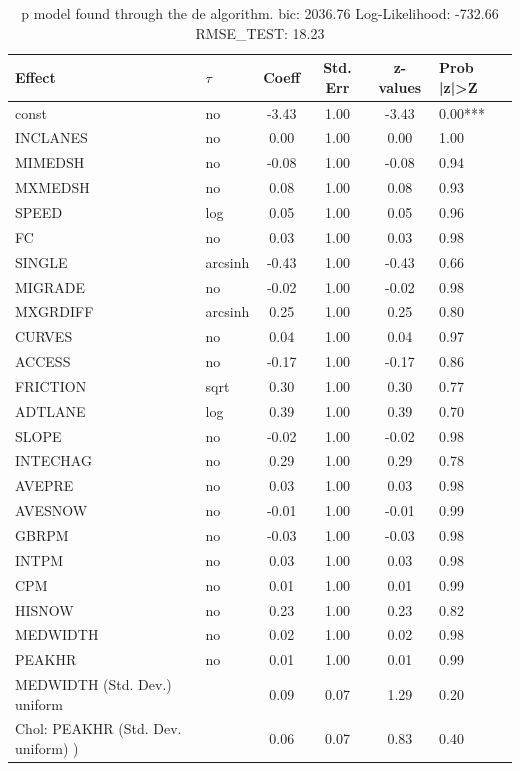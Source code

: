 \begin{table}
	\caption{p model found through the de algorithm. bic: 2036.76 Log-Likelihood: -732.66 RMSE_TEST: 18.23}
	\begin{center}
		\begin{tabular}{|l|l|c|c|c|l|}
			\hline
			Effect & $\tau$ & Coeff & Std. Err & z-values & Prob |z|>Z \\
			\hline
			const & no & -3.43 & 1.00 & -3.43 & 0.00*** \\
			\hline
			INCLANES & no & 0.00 & 1.00 & 0.00 & 1.00 \\
			\hline
			MIMEDSH & no & -0.08 & 1.00 & -0.08 & 0.94 \\
			\hline
			MXMEDSH & no & 0.08 & 1.00 & 0.08 & 0.93 \\
			\hline
			SPEED & log & 0.05 & 1.00 & 0.05 & 0.96 \\
			\hline
			FC & no & 0.03 & 1.00 & 0.03 & 0.98 \\
			\hline
			SINGLE & arcsinh & -0.43 & 1.00 & -0.43 & 0.66 \\
			\hline
			MIGRADE & no & -0.02 & 1.00 & -0.02 & 0.98 \\
			\hline
			MXGRDIFF & arcsinh & 0.25 & 1.00 & 0.25 & 0.80 \\
			\hline
			CURVES & no & 0.04 & 1.00 & 0.04 & 0.97 \\
			\hline
			ACCESS & no & -0.17 & 1.00 & -0.17 & 0.86 \\
			\hline
			FRICTION & sqrt & 0.30 & 1.00 & 0.30 & 0.77 \\
			\hline
			ADTLANE & log & 0.39 & 1.00 & 0.39 & 0.70 \\
			\hline
			SLOPE & no & -0.02 & 1.00 & -0.02 & 0.98 \\
			\hline
			INTECHAG & no & 0.29 & 1.00 & 0.29 & 0.78 \\
			\hline
			AVEPRE & no & 0.03 & 1.00 & 0.03 & 0.98 \\
			\hline
			AVESNOW & no & -0.01 & 1.00 & -0.01 & 0.99 \\
			\hline
			GBRPM & no & -0.03 & 1.00 & -0.03 & 0.98 \\
			\hline
			INTPM & no & 0.03 & 1.00 & 0.03 & 0.98 \\
			\hline
			CPM & no & 0.01 & 1.00 & 0.01 & 0.99 \\
			\hline
			HISNOW & no & 0.23 & 1.00 & 0.23 & 0.82 \\
			\hline
			MEDWIDTH & no & 0.02 & 1.00 & 0.02 & 0.98 \\
			\hline
			PEAKHR & no & 0.01 & 1.00 & 0.01 & 0.99 \\
			\hline
			MEDWIDTH (Std. Dev.) uniform &  & 0.09 & 0.07 & 1.29 & 0.20 \\
			\hline
			 Chol: PEAKHR (Std. Dev. uniform) ) &  & 0.06 & 0.07 & 0.83 & 0.40 \\
			\hline
		\end{tabular}
	\end{center}
\end{table}